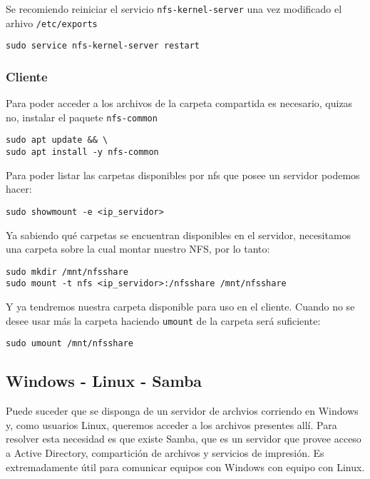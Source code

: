Se recomiendo reiniciar el servicio \texttt{nfs-kernel-server} una vez modificado el arhivo \texttt{/etc/exports} 

\begin{lstlisting}
sudo service nfs-kernel-server restart
\end{lstlisting}

\subsubsection{Cliente}

Para poder acceder a los archivos de la carpeta compartida es necesario, quizas no, instalar el paquete \texttt{nfs-common} 


\begin{lstlisting}
sudo apt update && \
sudo apt install -y nfs-common
\end{lstlisting}

Para poder listar las carpetas disponibles por nfs que posee un servidor podemos hacer:

\begin{lstlisting}
sudo showmount -e <ip_servidor>
\end{lstlisting}

Ya sabiendo qué carpetas se encuentran disponibles en el servidor, necesitamos una carpeta sobre la cual montar nuestro NFS, por lo tanto:

\begin{lstlisting}
sudo mkdir /mnt/nfsshare
sudo mount -t nfs <ip_servidor>:/nfsshare /mnt/nfsshare
\end{lstlisting}

Y ya tendremos nuestra carpeta disponible para uso en el cliente. Cuando no se desee usar más la carpeta haciendo \texttt{umount} de la carpeta será suficiente:

\begin{lstlisting}
sudo umount /mnt/nfsshare
\end{lstlisting}

\subsection{Windows - Linux - Samba}

Puede suceder que se disponga de un servidor de archvios corriendo en Windows y, como usuarios Linux, queremos acceder a los archivos presentes allí. Para resolver esta necesidad es que existe Samba, que es un servidor que provee acceso a Active Directory, compartición de archivos y servicios de impresión. Es extremadamente útil para comunicar equipos con Windows con equipo con Linux.

